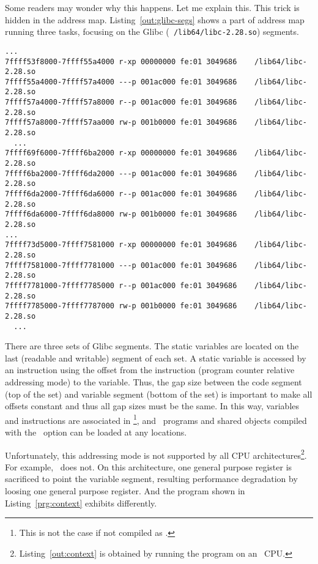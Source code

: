 Some readers may wonder why this happens. Let me explain this. This
trick is hidden in the address map. Listing~\ref{out:glibc-segs} shows
a part of address map running three tasks, focusing on the Glibc ({\tt
  /lib64/libc-2.28.so}) segments. 

\begin{lstlisting}[basicstyle=\tiny\tt, frame=tRBl, label=out:glibc-segs]
  ...
7ffff53f8000-7ffff55a4000 r-xp 00000000 fe:01 3049686    /lib64/libc-2.28.so
7ffff55a4000-7ffff57a4000 ---p 001ac000 fe:01 3049686    /lib64/libc-2.28.so
7ffff57a4000-7ffff57a8000 r--p 001ac000 fe:01 3049686    /lib64/libc-2.28.so
7ffff57a8000-7ffff57aa000 rw-p 001b0000 fe:01 3049686    /lib64/libc-2.28.so
  ...
7ffff69f6000-7ffff6ba2000 r-xp 00000000 fe:01 3049686    /lib64/libc-2.28.so
7ffff6ba2000-7ffff6da2000 ---p 001ac000 fe:01 3049686    /lib64/libc-2.28.so
7ffff6da2000-7ffff6da6000 r--p 001ac000 fe:01 3049686    /lib64/libc-2.28.so
7ffff6da6000-7ffff6da8000 rw-p 001b0000 fe:01 3049686    /lib64/libc-2.28.so
...
7ffff73d5000-7ffff7581000 r-xp 00000000 fe:01 3049686    /lib64/libc-2.28.so
7ffff7581000-7ffff7781000 ---p 001ac000 fe:01 3049686    /lib64/libc-2.28.so
7ffff7781000-7ffff7785000 r--p 001ac000 fe:01 3049686    /lib64/libc-2.28.so
7ffff7785000-7ffff7787000 rw-p 001b0000 fe:01 3049686    /lib64/libc-2.28.so
  ...
\end{lstlisting}

There are three sets of Glibc segments. The static variables are
located on the last (readable and writable) segment of each set. A
static variable is accessed by an instruction using the offset from
the instruction (program counter relative addressing mode) to the
variable. Thus, the gap size between the code segment (top of the set)
and variable segment (bottom of the set) is important to make all
offsets constant and thus all gap sizes must be the same. In this way,
variables and instructions are associated in \PIE\footnote{This is
not the case if not compiled as \PIE.}, and \PIE\ programs and shared
objects compiled with the \PIC\ option can be loaded at any locations.

Unfortunately, this addressing mode is not supported by all CPU
architectures\footnote{Listing~\ref{out:context} is obtained by
running the program on an \AMD\ CPU.}. For example, \INTEL\  
does not. On this architecture, one general purpose
register is sacrificed to point the variable segment, resulting
performance degradation by loosing one general purpose register. And
the program shown in Listing~\ref{prg:context} exhibits differently. 
